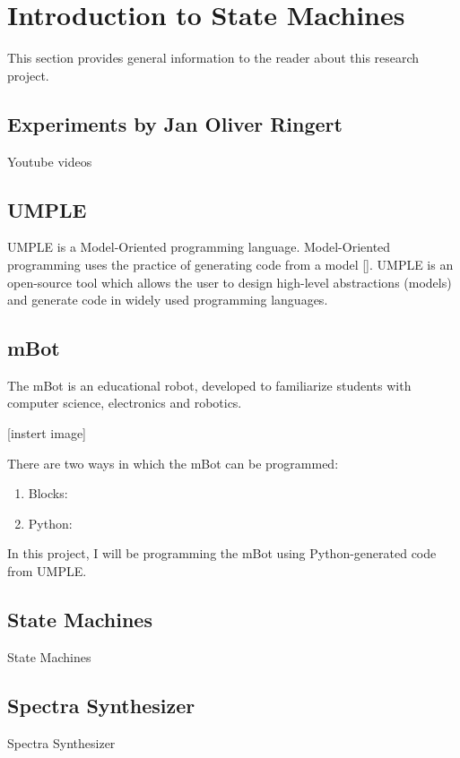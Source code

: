 \documentclass{l4proj}
\begin{document}
\section{Introduction to State Machines}

This section provides general information to the reader about this research project. 

\subsection{Experiments by Jan Oliver Ringert}

Youtube videos

\subsection{UMPLE}

UMPLE is a Model-Oriented programming language. Model-Oriented programming uses the practice of generating code from a model [\cite{1}]. UMPLE is an open-source tool which allows the user to design high-level abstractions (models) and generate code in widely used programming languages.

\subsection{mBot}

The mBot is an educational robot, developed to familiarize students with computer science, electronics and robotics.

[instert image]

There are two ways in which the mBot can be programmed:
\begin{enumerate}
  \item Blocks: 
  \item Python: 
\end{enumerate}
In this project, I will be programming the mBot using Python-generated code from UMPLE.


\subsection{State Machines}

State Machines

\subsection{Spectra Synthesizer}

Spectra Synthesizer
\end{document}
